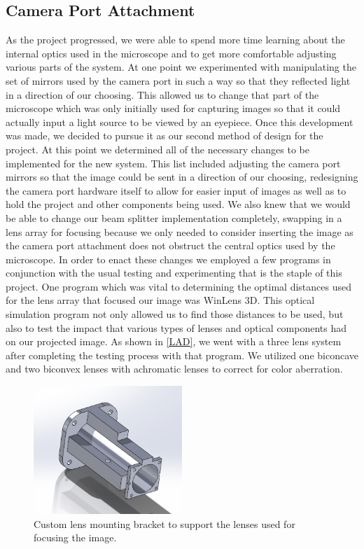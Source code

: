 \documentclass[12pt,a4paper]{article}
\begin{document}
\begin{appendices}
\subsection{Camera Port Attachment}
As the project progressed, we were able to spend more time learning about the internal optics used in the microscope and to get more comfortable adjusting various parts of the system.  At one point we experimented with manipulating the set of mirrors used by the camera port in such a way so that they reflected light in a direction of our choosing.  This allowed us to change that part of the microscope which was only initially used for capturing images so that it could actually input a light source to be viewed by an eyepiece.
Once this development was made, we decided to pursue it as our second method of design for the project.  At this point we determined all of the necessary changes to be implemented for the new system.  This list included adjusting the camera port mirrors so that the image could be sent in a direction of our choosing, redesigning the camera port hardware itself to allow for easier input of images as well as to hold the project and other components being used.  We also knew that we would be able to change our beam splitter implementation completely, swapping in a lens array for focusing because we only needed to consider inserting the image as the camera port attachment does not obstruct the central optics used by the microscope.
In order to enact these changes we employed a few programs in conjunction with the usual testing and experimenting that is the staple of this project.  One program which was vital to determining the optimal distances used for the lens array that focused our image was WinLens 3D.  This optical simulation program not only allowed us to find those distances to be used, but also to test the impact that various types of lenses and optical components had on our projected image.  As shown in \ref{LAD}, we went with a three lens system after completing the testing process with that program.  We utilized one biconcave and two biconvex lenses with achromatic lenses to correct for color aberration.

\begin{figure}[h]
	\centering
	\includegraphics[width = 0.5\textwidth]{pics/lens_housing.jpg}
	\caption[Lens Housing Model]{\centering Custom lens mounting bracket to support the lenses used for focusing the image.}
	\label{LHM}
\end{figure}


\end{appendices}
\end{document}
